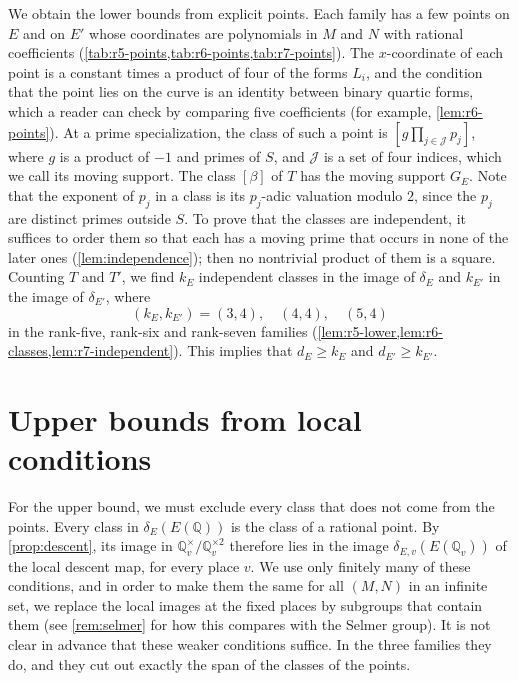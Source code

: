 \documentclass[12pt,oneside,openany]{book}
\theoremstyle{definition}
\theoremstyle{plain}
\numberwithin{equation}{chapter}
\theoremstyle{plain}
\theoremstyle{definition}
\theoremstyle{remark}
\newcommand{\Q}{\mathbb Q}
\newcommand{\sq}[1]{[#1]}
\newcommand{\sqgp}[1]{#1^{\times}/#1^{\times2}}
\begin{document}
We obtain the lower bounds from explicit points. Each family has a few points on $E$ and on $E'$ whose coordinates are polynomials in $M$ and $N$ with rational coefficients (\cref{tab:r5-points,tab:r6-points,tab:r7-points}). The $x$-coordinate of each point is a constant times a product of four of the forms $L_i$, and the condition that the point lies on the curve is an identity between binary quartic forms, which a reader can check by comparing five coefficients (for example, \cref{lem:r6-points}). At a prime specialization, the class of such a point is $\sq{g\prod_{j\in\mathcal J}p_j}$, where $g$ is a product of $-1$ and primes of $S$, and $\mathcal J$ is a set of four indices, which we call its moving support. The class $\sq\beta$ of $T$ has the moving support $G_E$. Note that the exponent of $p_j$ in a class is its $p_j$-adic valuation modulo $2$, since the $p_j$ are distinct primes outside $S$. To prove that the classes are independent, it suffices to order them so that each has a moving prime that occurs in none of the later ones (\cref{lem:independence}); then no nontrivial product of them is a square. Counting $T$ and $T'$, we find $k_E$ independent classes in the image of $\delta_E$ and $k_{E'}$ in the image of $\delta_{E'}$, where
\begin{equation*}
(k_E,k_{E'})=(3,4),\quad(4,4),\quad(5,4)
\end{equation*}
in the rank-five, rank-six and rank-seven families (\cref{lem:r5-lower,lem:r6-classes,lem:r7-independent}). This implies that $d_E\ge k_E$ and $d_{E'}\ge k_{E'}$.

\section{Upper bounds from local conditions}\label{sec:overview-local}

For the upper bound, we must exclude every class that does not come from the points. Every class in $\delta_E(E(\Q))$ is the class of a rational point. By \cref{prop:descent}, its image in $\sqgp{\Q_v}$ therefore lies in the image $\delta_{E,v}(E(\Q_v))$ of the local descent map, for every place $v$. We use only finitely many of these conditions, and in order to make them the same for all $(M,N)$ in an infinite set, we replace the local images at the fixed places by subgroups that contain them (see \cref{rem:selmer} for how this compares with the Selmer group). It is not clear in advance that these weaker conditions suffice. In the three families they do, and they cut out exactly the span of the classes of the points.
\end{document}
